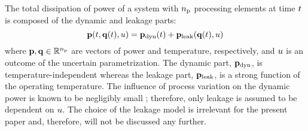 The total dissipation of power of a system with ${n_\text{p}}$ processing elements at time $t$ is composed of the dynamic and leakage parts:
\begin{equation} \elabel{total-power}
  \vP(\t, \vT(\t), \u) = \vP_\dyn(\t) + \vP_\leak(\vT(\t), \u)
\end{equation}
where $\mathbf{p}, \mathbf{q} \in \mathbb{R}^{n_\text{p}}$ are vectors of power and temperature, respectively, and $u$ is an outcome of the uncertain parametrization. The dynamic part, $\mathbf{p}_{\text{dyn}}$, is temperature-independent whereas the leakage part, $\mathbf{p}_{\text{leak}}$, is a strong function of the operating temperature.
The influence of process variation on the dynamic power is known to be negligibly small \cite{srivastava2010, juan2011, juan2012}; therefore, only leakage is assumed to be dependent on $u$.
The choice of the leakage model is irrelevant for the present paper and, therefore, will not be discussed any further.
